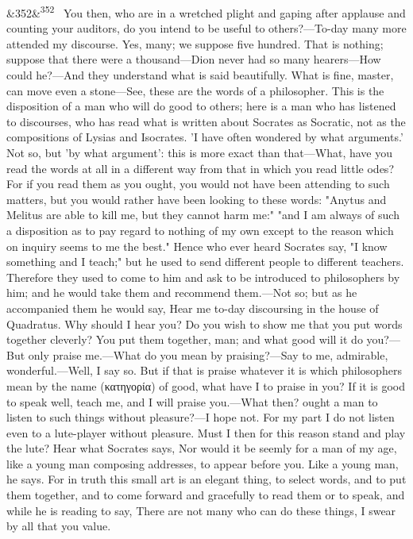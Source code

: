 \documentclass[12pt]{article}
\newcommand{\para}[1][]{\par\noindent\ifx&#1&\else\textsuperscript{\footnotesize #1}~\fi}
\begin{document}
\para[352] You then, who are in a wretched plight and gaping after applause and counting your auditors, do you intend to be useful to others?—To-day many more attended my discourse. Yes, many; we suppose five hundred. That is nothing; suppose that there were a thousand—Dion never had so many hearers—How could he?—And they understand what is said beautifully. What is fine, master, can move even a stone—See, these are the words of a philosopher. This is the disposition of a man who will do good to others; here is a man who has listened to discourses, who has read what is written about Socrates as Socratic, not as the compositions of Lysias and Isocrates. 'I have often wondered by what arguments.' Not so, but 'by what argument': this is more exact than that—What, have you read the words at all in a different way from that in which you read little odes? For if you read them as you ought, you would not have been attending to such matters, but you would rather have been looking to these words: "Anytus and Melitus are able to kill me, but they cannot harm me:" "and I am always of such a disposition as to pay regard to nothing of my own except to the reason which on inquiry seems to me the best." Hence who ever heard Socrates say, "I know something and I teach;" but he used to send different people to different teachers. Therefore they used to come to him and ask to be introduced to philosophers by him; and he would take them and recommend them.—Not so; but as he accompanied them he would say, Hear me to-day discoursing in the house of Quadratus. Why should I hear you? Do you wish to show me that you put words together cleverly? You put them together, man; and what good will it do you?—But only praise me.—What do you mean by praising?—Say to me, admirable, wonderful.—Well, I say so. But if that is praise whatever it is which philosophers mean by the name (κατηγορία) of good, what have I to praise in you? If it is good to speak well, teach me, and I will praise you.—What then? ought a man to listen to such things without pleasure?—I hope not. For my part I do not listen even to a lute-player without pleasure. Must I then for this reason stand and play the lute? Hear what Socrates says, Nor would it be seemly for a man of my age, like a young man composing addresses, to appear before you. Like a young man, he says. For in truth this small art is an elegant thing, to select words, and to put them together, and to come forward and gracefully to read them or to speak, and while he is reading to say, There are not many who can do these things, I swear by all that you value.
\end{document}
